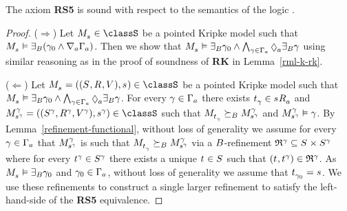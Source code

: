 \begin{lemma}\label{rml-s5-rs5}
The axiom {\bf RS5} is sound with respect to the semantics of the logic \logicRmlS{}.
\end{lemma}

\begin{proof}
($\Rightarrow$) 
Let $\kPModel{\kStateS} \in \classS$ be a pointed Kripke model such that $\kPModel{\kStateS} \entails \somerefsBs (\gamma_0 \land \coversA \Gamma_\agentA)$.
Then we show that $\kPModel{\kStateS} \entails \somerefsBs \gamma_0 \land \bigwedge_{\gamma \in \Gamma_\agentA} \possibleA \somerefsBs \gamma$ using similar reasoning as in the proof of soundness of {\bf RK} in Lemma~\ref{rml-k-rk}.

($\Leftarrow$)
Let $\kPModelAndTuple{\kStateS} \in \classS$ be a pointed Kripke model such that $\kPModel{\kStateS} \entails \somerefsBs \gamma_0 \land \bigwedge_{\gamma \in \Gamma_\agentA} \possibleA \somerefsBs \gamma$.
For every $\gamma \in \Gamma_\agentA$ there exists $\kStateT_\gamma \in \kSuccessorsA{\kStateS}$ and $\kPModelAndTuple[\gamma]{\kStateS[\gamma]} \in \classS$ such that $\kPModel{\kStateT_\gamma} \simulatesBs \kPModel[\gamma]{\kStateS[\gamma]}$ and $\kPModel[\gamma]{\kStateS[\gamma]} \entails \gamma$.
By Lemma~\ref{refinement-functional}, without loss of generality we assume for every $\gamma \in \Gamma_\agentA$ that $\kPModel[\gamma]{\kStateS[\gamma]}$ is such that $\kPModel{\kStateT_\gamma} \simulatesBs \kPModel[\gamma]{\kStateS[\gamma]}$ via a $\agentsB$-refinement $\refinement^{\gamma} \subseteq \kStates \times \kStates[\gamma]$ where for every $\kStateT[\gamma] \in \kStates[\gamma]$ there exists a unique $\kStateT \in \kStates$ such that $(\kStateT, \kStateT[\gamma]) \in \refinement^{\gamma}$.
As $\kPModel{\kStateS} \entails \somerefsBs \gamma_0$ and $\gamma_0 \in \Gamma_\agentA$, without loss of generality we assume that $\kStateT_{\gamma_0} = \kStateS$.
We use these refinements to construct a single larger refinement to satisfy the left-hand-side of the {\bf RS5} equivalence.


\end{proof}
